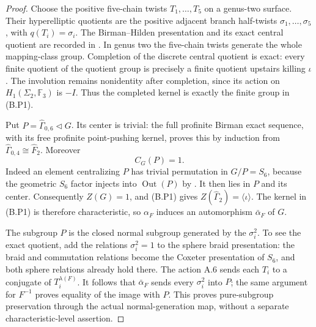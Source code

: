 \begin{proof}
Choose the positive five-chain twists $T_1,\ldots,T_5$ on a
genus-two surface. Their hyperelliptic quotients are the positive
adjacent branch half-twists $\sigma_1,\ldots,\sigma_5$, with
$q(T_i)=\sigma_i$. The Birman--Hilden presentation and its exact
central quotient are recorded in
\cite[Theorems 3.2--3.3 and the following central-extension display,
pp.~6--7]{CA_EndoKamada2016}. In genus two the five-chain twists
generate the whole mapping-class group. Completion of the discrete
central quotient is exact: every finite quotient of the quotient
group is precisely a finite quotient upstairs killing $\iota$.
The involution remains nonidentity after completion, since its
action on $H_1(\Sigma_2,\mathbb F_3)$ is $-I$. Thus the completed
kernel is exactly the finite group in (B.P1).

Put $P=\widehat\Gamma_{0,6}\triangleleft G$.
Its center is trivial: the full profinite Birman exact sequence,
with its free profinite point-pushing kernel, proves this by
induction from $\widehat\Gamma_{0,4}\cong\widehat F_2$.
Moreover
\[
                         C_G(P)=1.                       \tag{B.P3}
\]
Indeed an element centralizing $P$ has trivial permutation in
$G/P=S_6$, because the geometric $S_6$ factor injects into
$\operatorname{Out}(P)$ by
\cite[Corollary 2.8]{CA_HMM}. It then lies in $P$ and its center.
Consequently $Z(G)=1$, and (B.P1) gives
$Z(\widehat\Gamma_2)=\langle\iota\rangle$.
The kernel in (B.P1) is therefore characteristic, so $\alpha_F$
induces an automorphism $\bar\alpha_F$ of $G$.

The subgroup $P$ is the closed normal subgroup generated by the
$\sigma_i^2$. To see the exact quotient, add the relations
$\sigma_i^2=1$ to the sphere braid presentation: the braid and
commutation relations become the Coxeter presentation of $S_6$,
and both sphere relations already hold there. The action A.6
sends each $T_i$ to a conjugate of $T_i^{\lambda(F)}$.
It follows that $\bar\alpha_F$ sends every $\sigma_i^2$ into $P$;
the same argument for $F^{-1}$ proves equality of the image with
$P$. This proves pure-subgroup preservation through the actual
normal-generation map, without a separate characteristic-level
assertion.


\end{proof}
